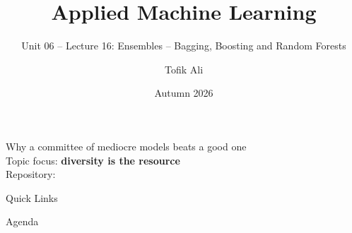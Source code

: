 \documentclass[aspectratio=169]{beamer}
\title[Applied Machine Learning]{Applied Machine Learning}
\subtitle{Unit 06 -- Lecture 16: Ensembles -- Bagging, Boosting and Random
Forests}
\author{Tofik Ali}
\institute{School of Computer Science, UPES Dehradun}
\date{Autumn 2026}
\begin{document}
\UPESCoverFrame
\setcounter{framenumber}{0}

\begin{frame}
  \titlepage
  \begin{center}
    \footnotesize Why a committee of mediocre models beats a good one\\[0.25em]
    \footnotesize Topic focus: \textbf{diversity is the resource}\\[0.25em]
    \footnotesize Repository: \texttt{\AMLRepoURL}
  \end{center}
  \slidesources{\AMLUnitVISources}
\end{frame}

\begin{frame}{Quick Links}
  \centering
  \hyperlink{sec:why}{}\hspace{0.4em}
  \hyperlink{sec:bag}{}\hspace{0.4em}
  \hyperlink{sec:var}{}\hspace{0.4em}
  \hyperlink{sec:rf}{}\\[0.6em]
  \hyperlink{sec:imp}{}\hspace{0.4em}
  \hyperlink{sec:boost}{}\hspace{0.4em}
  \hyperlink{sec:vs}{}\hspace{0.4em}
  \hyperlink{sec:summary}{}
\end{frame}

\begin{frame}{Agenda}
  \tableofcontents
\end{frame}
\end{document}

